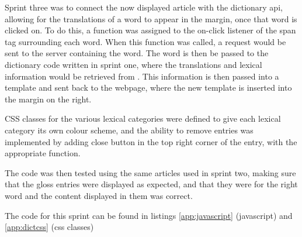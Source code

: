Sprint three was to connect the now displayed article with the dictionary api, allowing for the translations of a word to appear in the margin, once that word is clicked on. To do this, a function was assigned to the on-click listener of the span tag surrounding each word. When this function was called, a request would be sent to the server containing the word. The word is then be passed to the dictionary code written in sprint one, where the translations and lexical information would be retrieved from \textcite{oxford}. This information is then passed into a template and sent back to the webpage, where the new template is inserted into the margin on the right. 

CSS classes for the various lexical categories were defined to give each lexical category its own colour scheme, and the ability to remove entries was implemented by adding close button in the top right corner of the entry, with the appropriate function. 

The code was then tested using the same articles used in sprint two, making sure that the gloss entries were displayed as expected, and that they were for the right word and the content displayed in them was correct. 

The code for this sprint can be found in listings \ref{app:javascript} (javascript) and \ref{app:dictcss} (css classes)

